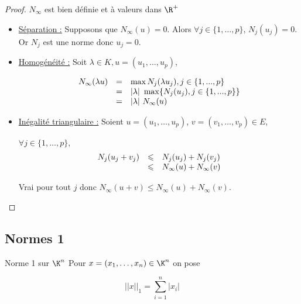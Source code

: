 \begin{proof}
    $N_\infty$ est bien définie et à valeurs dans $\R^+$

    \begin{itemize}
        \item \uline{Séparation :}
        Supposons que $N_\infty(u) = 0$. 
        Alors $\forall j \in \{1, \dots, p\}$, $N_j(u_j) = 0$. 
        Or $N_j$ est une norme donc $u_j = 0$.

        \item \uline{Homogénéité :}
        Soit $\lambda \in K, u = (u_1, \dots, u_p)$,

        \[
            \begin{array}{rcl}
                N_\infty(\lambda u) & = & \max{N_j(\lambda u_j), j \in \{1, ..., p\}} \\
                \space & = & |\lambda| ~ \max\{N_j(u_j), j \in \{1, ..., p\}\} \\
                \space & = & |\lambda| ~ N_\infty(u) \\
            \end{array}
        \]

        \item \uline{Inégalité triangulaire :}
        Soient $u = (u_1, \dots, u_p)$, $v = (v_1, \dots, v_p) \in E$,

        $\forall j \in \{1, \dots, p\}$,
        \[
            \begin{array}{rcl}
                N_j(u_j + v_j) & \leqslant & N_j(u_j) + N_j(v_j) \\
                \space & \leqslant & N_\infty(u) + N_\infty(v) \\
            \end{array}
        \]

            Vrai pour tout $j$ donc $N_\infty(u + v) \leqslant N_\infty(u) + N_\infty(v)$.
    \end{itemize}
\end{proof}

\subsection{Normes 1}

\begin{definition}{Norme 1 sur $\K^n$}{}
    Pour $x = (x_1, \dots, x_n) \in \K^n$ on pose 

    $$||x||_1 = \sum_{i = 1 }^{n } |x_i|$$
\end{definition}

